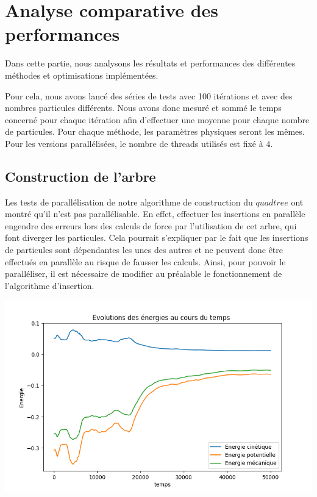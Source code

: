 \chapter{Analyse comparative des  performances}
Dans cette partie, nous analysons les résultats et performances des différentes méthodes et optimisations implémentées.

Pour cela, nous avons lancé des séries de tests avec 100 itérations et avec des nombres particules différents. Nous avons donc mesuré et sommé le temps concerné pour chaque itération afin d'effectuer une moyenne pour chaque nombre de particules. Pour chaque méthode, les paramètres physiques seront les mêmes. Pour les versions parallélisées, le nombre de threads utilisés est fixé à $4$.

\section{Construction de l'arbre}

Les tests de parallélisation de notre algorithme de construction du $quadtree$ ont montré qu'il n'est pas parallélisable. En effet,  effectuer les insertions en parallèle engendre des erreurs lors  des calculs de force par l'utilisation de cet arbre, qui font diverger les particules. Cela pourrait s'expliquer par le fait que les insertions de particules sont dépendantes les unes des autres et ne peuvent donc être effectués en parallèle au risque de fausser les calculs. Ainsi, pour pouvoir le paralléliser, il est nécessaire de modifier au préalable le fonctionnement de l'algorithme d'insertion.

\begin{center}
\includegraphics[scale=0.6]{./resultats/Energy_tree.png}
\captionsetup{hypcap=false}
\label{fig11}
\end{center}

